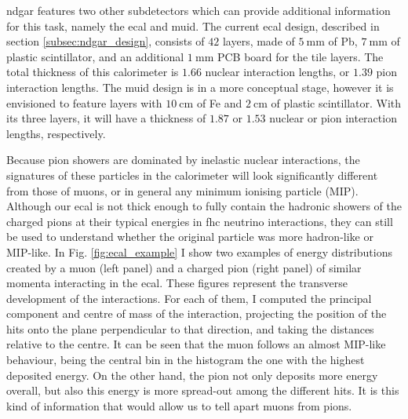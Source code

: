 \gls{ndgar} features two other subdetectors which can provide additional information for this task, namely the \gls{ecal} and \gls{muid}. The current \gls{ecal} design, described in section \ref{subsec:ndgar_design}, consists of $42$ layers, made of $5~\mathrm{mm}$ of Pb, $7~\mathrm{mm}$ of plastic scintillator, and an additional $1~\mathrm{mm}$ PCB board for the tile layers. The total thickness of this calorimeter is $1.66$ nuclear interaction lengths, or $1.39$ pion interaction lengths. The \gls{muid} design is in a more conceptual stage, however it is envisioned to feature layers with $10~\mathrm{cm}$ of Fe and $2~\mathrm{cm}$ of plastic scintillator. With its three layers, it will have a thickness of $1.87$ or $1.53$ nuclear or pion interaction lengths, respectively.

Because pion showers are dominated by inelastic nuclear interactions, the signatures of these particles in the calorimeter will look significantly different from those of muons, or in general any minimum ionising particle (MIP). Although our \gls{ecal} is not thick enough to fully contain the hadronic showers of the charged pions at their typical energies in \gls{fhc} neutrino interactions, they can still be used to understand whether the original particle was more hadron-like or MIP-like. In Fig. \ref{fig:ecal_example} I show two examples of energy distributions created by a muon (left panel) and a charged pion (right panel) of similar momenta interacting in the \gls{ecal}. These figures represent the transverse development of the interactions. For each of them, I computed the principal component and centre of mass of the interaction, projecting the position of the hits onto the plane perpendicular to that direction, and taking the distances relative to the centre. It can be seen that the muon follows an almost MIP-like behaviour, being the central bin in the histogram the one with the highest deposited energy. On the other hand, the pion not only deposits more energy overall, but also this energy is more spread-out among the different hits. It is this kind of information that would allow us to tell apart muons from pions.

